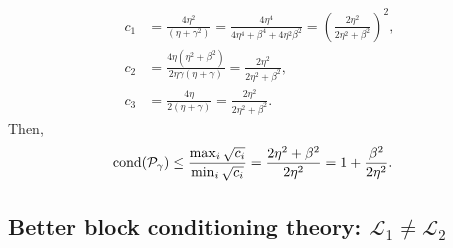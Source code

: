 \documentclass[a4paper,10pt]{article}
\begin{document}
{\begin{align*}
c_1 & = \frac{4\eta^2}{(\eta+\gamma^2)} = \frac{4\eta^4}{4\eta^4+\beta^4+4\eta^2\beta^2}
	= \left(\frac{2\eta^2}{2\eta^2+\beta^2}\right)^2, \\
c_2 & = \frac{4\eta(\eta^2+\beta^2)}{2\eta\gamma(\eta+\gamma)} 
	= \frac{2\eta^2}{2\eta^2+\beta^2}, \\
c_3 & = \frac{4\eta}{2(\eta+\gamma)} = \frac{2\eta^2}{2\eta^2+\beta^2}.
\end{align*}
%
Then,
%
\begin{align*}
\textnormal{cond}(\mathcal{P}_\gamma) \leq \frac{\max_i \sqrt{c_i}}{\min_i \sqrt{c_i}} 
	& = \frac{2\eta^2+\beta^2}{2\eta^2} = 1 + \frac{\beta^2}{2\eta^2}.
\end{align*}


\subsection{Better block conditioning theory: $\mathcal{L}_1 \neq \mathcal{L}_2$}

}
\end{document}
